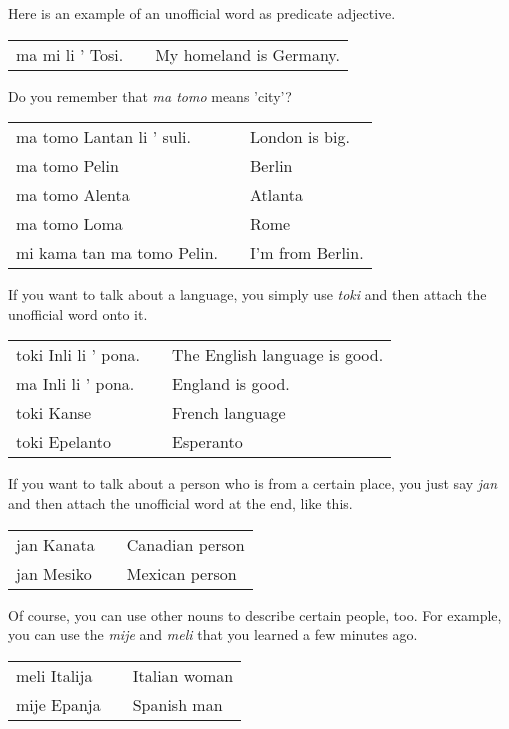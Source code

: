 Here is an example of an unofficial word as predicate adjective.

\begin{supertabular}{p{5,5cm}|ll}
ma mi li ' Tosi. && My homeland is Germany.  \\
\end{supertabular}

Do you remember that \textit{ma tomo} means 'city'? 

\begin{supertabular}{p{5,5cm}|ll}
ma tomo Lantan li ' suli. && London is big. \\
ma tomo Pelin && Berlin \\
ma tomo Alenta && Atlanta \\
ma tomo Loma && Rome \\
mi kama tan ma tomo Pelin. && I'm from Berlin. \\
\end{supertabular} 

If you want to talk about a language, you simply use \textit{toki} and then attach the unofficial word onto it. 

\begin{supertabular}{p{5,5cm}|ll}
toki Inli li ' pona. && The English language is good. \\
ma Inli li ' pona. && England is good. \\
toki Kanse && French language \\
toki Epelanto && Esperanto \\
\end{supertabular} 

If you want to talk about a person who is from a certain place, you just say \textit{jan} and then attach the unofficial word at the end, like this. 

\begin{supertabular}{p{5,5cm}|ll}
jan Kanata && Canadian person \\
jan Mesiko && Mexican person \\
\end{supertabular} 

Of course, you can use other nouns to describe certain people, too. 
For example, you can use the \textit{mije} and \textit{meli} that you learned a few minutes ago. 

\begin{supertabular}{p{5,5cm}|ll}
meli Italija && Italian woman \\
mije Epanja && Spanish man \\
\end{supertabular} 


